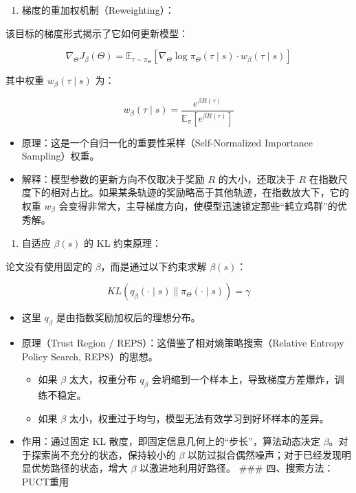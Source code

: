 \begin{enumerate}
\def\labelenumi{\arabic{enumi}.}
\setcounter{enumi}{1}
\tightlist
\item
  梯度的重加权机制（Reweighting）：
\end{enumerate}

该目标的梯度形式揭示了它如何更新模型：

\[
\nabla_\Theta J_\beta(\Theta) = \mathbb{E}_{\tau \sim \pi_\Theta}\left[\nabla_\Theta \log \pi_\Theta(\tau \mid s) \cdot w_\beta(\tau \mid s)\right]
\]

其中权重 \(w_\beta(\tau \mid s)\) 为：

\[
w_\beta(\tau \mid s) = \frac{e^{\beta R(\tau)}}{\mathbb{E}_{\pi}\left[e^{\beta R(\tau)}\right]}
\]

\begin{itemize}
\tightlist
\item
  原理：这是一个自归一化的重要性采样（Self-Normalized Importance Sampling）权重。
\item
  解释：模型参数的更新方向不仅取决于奖励 \(R\) 的大小，还取决于 \(R\) 在指数尺度下的相对占比。如果某条轨迹的奖励略高于其他轨迹，在指数放大下，它的权重 \(w_\beta\) 会变得非常大，主导梯度方向，使模型迅速锁定那些``鹤立鸡群''的优秀解。
\end{itemize}

\begin{enumerate}
\def\labelenumi{\arabic{enumi}.}
\setcounter{enumi}{2}
\tightlist
\item
  自适应 \(\beta(s)\) 的 KL 约束原理：
\end{enumerate}

论文没有使用固定的 \(\beta\)，而是通过以下约束求解 \(\beta(s)\)：

\[
KL(q_\beta(\cdot \mid s) \| \pi_\Theta(\cdot \mid s)) = \gamma
\]

\begin{itemize}
\tightlist
\item
  这里 \(q_\beta\) 是由指数奖励加权后的理想分布。
\item
  原理（Trust Region / REPS）：这借鉴了相对熵策略搜索（Relative Entropy Policy Search, REPS）的思想。

  \begin{itemize}
  \tightlist
  \item
    如果 \(\beta\) 太大，权重分布 \(q_\beta\) 会坍缩到一个样本上，导致梯度方差爆炸，训练不稳定。
  \item
    如果 \(\beta\) 太小，权重过于均匀，模型无法有效学习到好坏样本的差异。
  \end{itemize}
\item
  作用：通过固定 KL 散度，即固定信息几何上的``步长''，算法动态决定 \(\beta\)。对于探索尚不充分的状态，保持较小的 \(\beta\) 以防过拟合偶然噪声；对于已经发现明显优势路径的状态，增大 \(\beta\) 以激进地利用好路径。
  \#\#\# 四、搜索方法：PUCT重用
\end{itemize}

